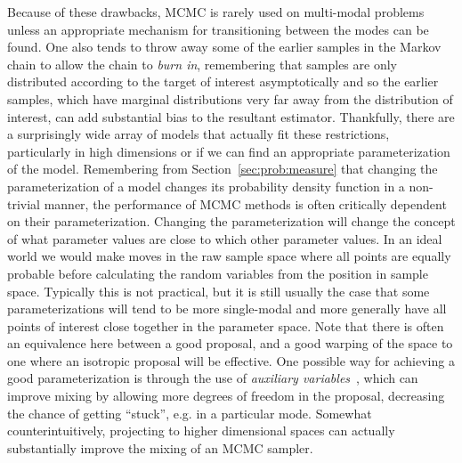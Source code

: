 Because of these drawbacks, MCMC is rarely used on multi-modal problems unless an appropriate mechanism
for transitioning between the modes can be found.  One also tends to throw away some of the earlier samples
in the Markov chain to allow the chain to \emph{burn in}, remembering that samples are only distributed according
to the target of interest asymptotically and so the earlier samples, which have marginal distributions very far away
from the distribution of interest, can add substantial bias to the resultant estimator.
Thankfully, there are a surprisingly wide array of models that actually 
fit these restrictions, particularly in high dimensions or if we can find an appropriate parameterization of the model.  
Remembering from Section~\ref{sec:prob:measure} that changing the parameterization of a model changes its probability
density function in a non-trivial manner, the performance of MCMC methods is often critically dependent on
their parameterization.  Changing the parameterization will change
the concept of what parameter values are close to which other parameter values.  In an ideal world we
would make moves in the raw sample space where all points are equally probable before calculating the
random variables from the position in sample space.  Typically this is not practical, but it is still usually the
case that some parameterizations will tend to be more single-modal and more generally have all points of
interest close together in the parameter space.  Note that there is often an equivalence here between a good proposal,
and a good warping of the space to one where an isotropic proposal will be effective.  One possible way for
achieving a good parameterization is through the use of  
\emph{auxiliary variables}~\citep{higdon1998auxiliary,andrieu2010particle},
which can improve mixing by allowing more degrees of freedom in the proposal, decreasing the chance of getting
``stuck'', e.g. in a particular mode.  Somewhat counterintuitively, projecting
to higher dimensional spaces can actually substantially improve the mixing of an MCMC sampler.

